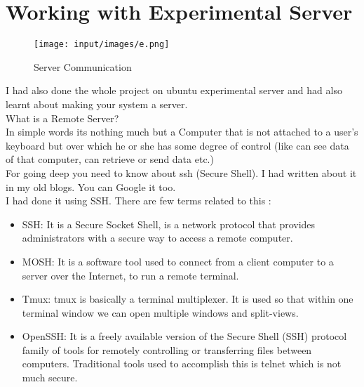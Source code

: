 \section{Working with Experimental Server}
\begin{figure}[!ht]
\centering
\texttt{[image: input/images/e.png]}                   
\caption{Server Communication}
\hspace{-1.5em}
\end{figure}
I had also done the whole project on ubuntu experimental server and had also learnt about making your system a server.\\
What is a Remote Server?\\
In simple words its nothing much but a Computer that is not attached to a user's keyboard but over which he or she has some degree of control (like can see data of that computer, can retrieve or send data etc.)\\
For going deep you need to know about ssh (Secure Shell). I had  written about it in my old blogs. You can Google it too.\\
I had done it using SSH. There are few terms related to this :\\
\begin{itemize}
\item SSH: It is a Secure Socket Shell, is a network protocol that provides administrators with a secure way to access a remote computer.
\item MOSH: It is a software tool used to connect from a client computer to a server over the Internet, to run a remote terminal. 
\item Tmux: tmux is basically a terminal multiplexer. It is used so that within
one terminal window we can open multiple windows and split-views.
\item OpenSSH: It is a freely available version of the Secure Shell (SSH) protocol family of tools for remotely controlling or transferring files between computers. Traditional tools used to accomplish this is telnet which is not much secure.
\end{itemize}

